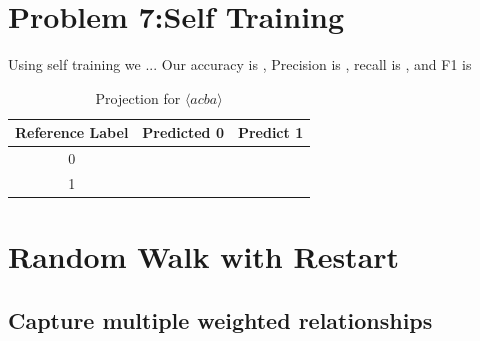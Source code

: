 \documentclass[11pt]{article}
\begin{document}
\section{Problem 7:Self Training}
Using self training we ...
Our accuracy is , Precision is , recall is , and F1 is 
\begin{table}[]
    \centering
    \begin{tabular}{|c|c|c|} \hline
       Reference Label  & Predicted 0 & Predict 1   \\ \hline
       0 & & \\ \hline
       1 & & \\ \hline
    \end{tabular}
    \caption{Projection for $\langle acba\rangle$}
    \label{tab:Accuracy}
\end{table}
\section{Random Walk with Restart}
\subsection{Capture multiple weighted relationships}
\end{document}
